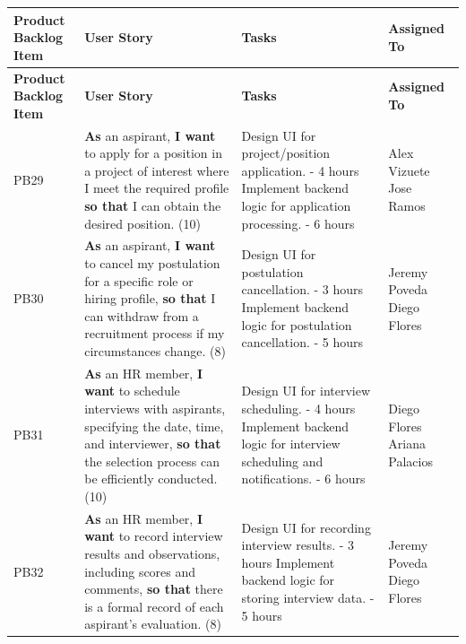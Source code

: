 \documentclass{scrreprt}
\begin{document}
\begin{longtable}{|p{1.5cm}|p{5.5cm}|p{4.5cm}|p{3cm}|} \hline
	\textbf{Product Backlog Item} & \textbf{User Story} & \textbf{Tasks} & \textbf{Assigned To} \\ \hline
	\endfirsthead
	\hline
	\textbf{Product Backlog Item} & \textbf{User Story} & \textbf{Tasks} & \textbf{Assigned To} \\ \hline
	\endhead
	
	
	PB29 & \textbf{As} an aspirant, \textbf{I want} to apply for a position in a project of interest where I meet the required profile \textbf{so that} I can obtain the desired position. (10) & 
	Design UI for project/position application. - 4 hours \newline
	Implement backend logic for application processing. - 6 hours & 
	Alex Vizuete \newline 
	Jose Ramos \\ \hline
	
	PB30 & \textbf{As} an aspirant, \textbf{I want} to cancel my postulation for a specific role or hiring profile, \textbf{so that} I can withdraw from a recruitment process if my circumstances change. (8) & 
	Design UI for postulation cancellation. - 3 hours \newline
	Implement backend logic for postulation cancellation. - 5 hours & 
	Jeremy Poveda \newline 
	Diego Flores \\ \hline
	
	
	PB31 & \textbf{As} an HR member, \textbf{I want} to schedule interviews with aspirants, specifying the date, time, and interviewer, \textbf{so that} the selection process can be efficiently conducted. (10) &
	Design UI for interview scheduling. - 4 hours \newline
	Implement backend logic for interview scheduling and notifications. - 6 hours &
	Diego Flores \newline
	Ariana Palacios \\ \hline
	
	PB32 & \textbf{As} an HR member, \textbf{I want} to record interview results and observations, including scores and comments, \textbf{so that} there is a formal record of each aspirant's evaluation. (8) &
	Design UI for recording interview results. - 3 hours \newline
	Implement backend logic for storing interview data. - 5 hours &
	Jeremy Poveda \newline
	Diego Flores \\ \hline
	

\end{longtable}
\end{document}
